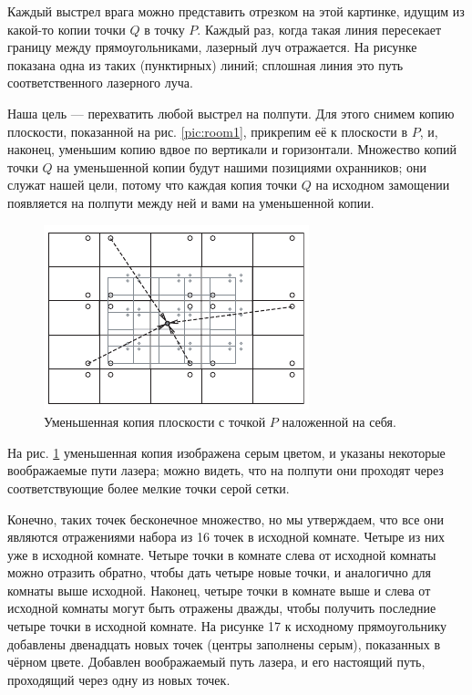 Каждый выстрел врага можно представить отрезком на этой картинке, идущим из какой-то копии точки $Q$ в точку $P$.
Каждый раз, когда такая линия пересекает границу между прямоугольниками, лазерный луч отражается.
На рисунке показана одна из таких (пунктирных) линий; сплошная линия это путь соответственного лазерного луча.

Наша цель --- перехватить любой выстрел на полпути.
Для этого снимем копию плоскости, показанной на рис. \ref{pic:room1}, прикрепим её к плоскости в $P$, и, наконец, уменьшим копию вдвое по вертикали и горизонтали.
Множество копий точки $Q$ на уменьшенной копии будут нашими позициями охранников; они служат нашей цели, потому что каждая копия точки $Q$ на исходном замощении появляется на полпути между ней и вами на уменьшенной копии.

\begin{figure}[t!]
\centering
\includegraphics[scale=1]{pics/room2}
\caption{Уменьшенная копия плоскости с точкой $P$ наложенной на себя.}
\label{pic:room2}
\end{figure}

На рис. \ref{pic:room2} уменьшенная копия изображена серым цветом, и указаны некоторые воображаемые пути лазера; можно видеть, что на полпути они проходят через соответствующие более мелкие точки серой сетки.

Конечно, таких точек бесконечное множество, но мы утверждаем, что все они являются отражениями набора из 16 точек в исходной комнате.
Четыре из них уже в исходной комнате.
Четыре точки в комнате слева от исходной комнаты можно отразить обратно, чтобы дать четыре новые точки, и аналогично для комнаты выше исходной.
Наконец, четыре точки в комнате выше и слева от исходной комнаты могут быть отражены дважды, чтобы получить последние четыре точки в исходной комнате.
На рисунке 17 к исходному прямоугольнику добавлены двенадцать новых точек (центры заполнены серым), показанных в чёрном цвете.
Добавлен воображаемый путь лазера, и его настоящий путь, проходящий через одну из новых точек.

